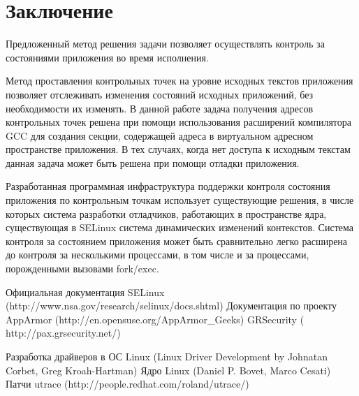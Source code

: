 
\bigskip
\section {Заключение} 

Предложенный метод решения задачи 
позволяет осуществлять контроль за 
состояниями приложения во время исполнения.

Метод проставления контрольных точек
на уровне исходных текстов приложения позволяет 
отслеживать изменения состояний исходных 
приложений, без необходимости их изменять. 
В данной работе задача получения 
адресов контрольных точек решена при помощи 
использования расширений компилятора GCC 
для создания секции, содержащей адреса в 
виртуальном адресном пространстве приложения.
В тех случаях, когда нет доступа к исходным 
текстам данная задача может быть решена при 
помощи отладки приложения. 

Разработанная программная инфраструктура 
поддержки контроля состояния приложения 
по контрольным точкам использует 
существующие решения, в числе которых система 
разработки отладчиков, работающих в пространстве 
ядра, существующая в SELinux система динамических 
изменений контекстов. Система контроля за 
состоянием приложения может быть сравнительно 
легко расширена до контроля за несколькими процессами, 
в том числе и за процессами, порожденными вызовами 
fork/exec. 


\bigskip
\begin{thebibliography}{99}
Официальная документация SELinux 
(http://www.nsa.gov/research/selinux/docs.shtml)
Документация по проекту AppArmor 
(http://en.opensuse.org/AppArmor\_Geeks)
GRSecurity ( http://pax.grsecurity.net/)

Разработка драйверов в ОС Linux 
(Linux Driver Development by Johnatan Corbet, 
Greg Kroah-Hartman)
Ядро Linux (Daniel P. Bovet, Marco Cesati) 
Патчи utrace (http://people.redhat.com/roland/utrace/)

\end{thebibliography}
